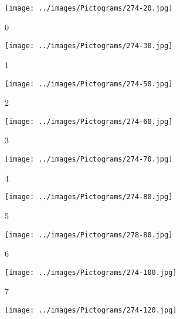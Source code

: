 \begin{figure}[H]
   \centering
	\captionsetup[subfigure]{labelformat=empty}
   \begin{subfigure}[b]{0.1\textwidth}
       \centering
       \texttt{[image: ../images/Pictograms/274-20.jpg]}
       \caption{0}
   \end{subfigure}
   \hspace{3em}%
   \begin{subfigure}[b]{0.1\textwidth}
       \centering
       \texttt{[image: ../images/Pictograms/274-30.jpg]}
       \caption{1}
   \end{subfigure}
   \hspace{3em}%
   \begin{subfigure}[b]{0.1\textwidth}
       \centering
       \texttt{[image: ../images/Pictograms/274-50.jpg]}
       \caption{2}
   \end{subfigure}
   \hspace{3em}%
   \begin{subfigure}[b]{0.1\textwidth}
    \centering
    \texttt{[image: ../images/Pictograms/274-60.jpg]}
    \caption{3}
	\end{subfigure}
	\hspace{3em}%
	\begin{subfigure}[b]{0.1\textwidth}
		\centering
		\texttt{[image: ../images/Pictograms/274-70.jpg]}
		\caption{4}
	\end{subfigure}
	\hspace{3em}%
	\begin{subfigure}[b]{0.1\textwidth}
		\centering
		\texttt{[image: ../images/Pictograms/274-80.jpg]}
		\caption{5}
	\end{subfigure}
	\hspace{3em}%
	\begin{subfigure}[b]{0.1\textwidth}
		\centering
		\texttt{[image: ../images/Pictograms/278-80.jpg]}
		\caption{6}
	\end{subfigure}
	\hspace{3em}%
	\begin{subfigure}[b]{0.1\textwidth}
	\centering
	\texttt{[image: ../images/Pictograms/274-100.jpg]}
	\caption{7}
	\end{subfigure}
	\hspace{3em}%
	\begin{subfigure}[b]{0.1\textwidth}
		\centering
		\texttt{[image: ../images/Pictograms/274-120.jpg]}

\end{subfigure}
\end{figure}
